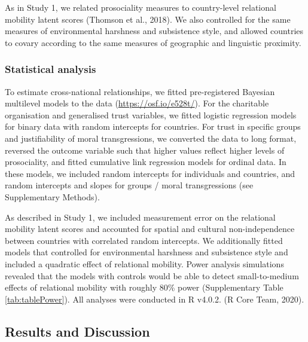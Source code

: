 \documentclass[
  man,floatsintext]{apa6}
\begin{document}
As in Study 1, we related prosociality measures to country-level relational mobility latent scores (Thomson et al., 2018). We also controlled for the same measures of environmental harshness and subsistence style, and allowed countries to covary according to the same measures of geographic and linguistic proximity.

\hypertarget{statistical-analysis-1}{%
\subsubsection{Statistical analysis}\label{statistical-analysis-1}}

To estimate cross-national relationships, we fitted pre-registered Bayesian multilevel models to the data (\url{https://osf.io/e528t/}). For the charitable organisation and generalised trust variables, we fitted logistic regression models for binary data with random intercepts for countries. For trust in specific groups and justifiability of moral transgressions, we converted the data to long format, reversed the outcome variable such that higher values reflect higher levels of prosociality, and fitted cumulative link regression models for ordinal data. In these models, we included random intercepts for individuals and countries, and random intercepts and slopes for groups / moral transgressions (see Supplementary Methods).

As described in Study 1, we included measurement error on the relational mobility latent scores and accounted for spatial and cultural non-independence between countries with correlated random intercepts. We additionally fitted models that controlled for environmental harshness and subsistence style and included a quadratic effect of relational mobility. Power analysis simulations revealed that the models with controls would be able to detect small-to-medium effects of relational mobility with roughly 80\% power (Supplementary Table \ref{tab:tablePower}). All analyses were conducted in R v4.0.2. (R Core Team, 2020).

\hypertarget{results-and-discussion-1}{%
\subsection{Results and Discussion}\label{results-and-discussion-1}}
\end{document}
